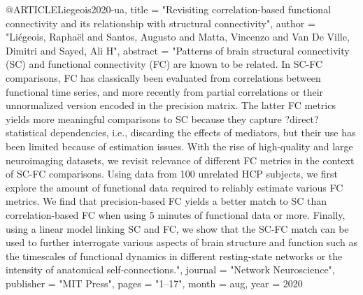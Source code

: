 @ARTICLE{Liegeois2020-ua,
	title     = "Revisiting correlation-based functional connectivity and its
	relationship with structural connectivity",
	author    = "Li{\'e}geois, Rapha{\"e}l and Santos, Augusto and Matta,
	Vincenzo and Van De Ville, Dimitri and Sayed, Ali H",
	abstract  = "Patterns of brain structural connectivity (SC) and functional
	connectivity (FC) are known to be related. In SC-FC comparisons,
	FC has classically been evaluated from correlations between
	functional time series, and more recently from partial
	correlations or their unnormalized version encoded in the
	precision matrix. The latter FC metrics yields more meaningful
	comparisons to SC because they capture ?direct? statistical
	dependencies, i.e., discarding the effects of mediators, but
	their use has been limited because of estimation issues. With
	the rise of high-quality and large neuroimaging datasets, we
	revisit relevance of different FC metrics in the context of
	SC-FC comparisons. Using data from 100 unrelated HCP subjects,
	we first explore the amount of functional data required to
	reliably estimate various FC metrics. We find that
	precision-based FC yields a better match to SC than
	correlation-based FC when using 5 minutes of functional data or
	more. Finally, using a linear model linking SC and FC, we show
	that the SC-FC match can be used to further interrogate various
	aspects of brain structure and function such as the timescales
	of functional dynamics in different resting-state networks or
	the intensity of anatomical self-connections.",
	journal   = "Network Neuroscience",
	publisher = "MIT Press",
	pages     = "1--17",
	month     =  aug,
	year      =  2020
}

